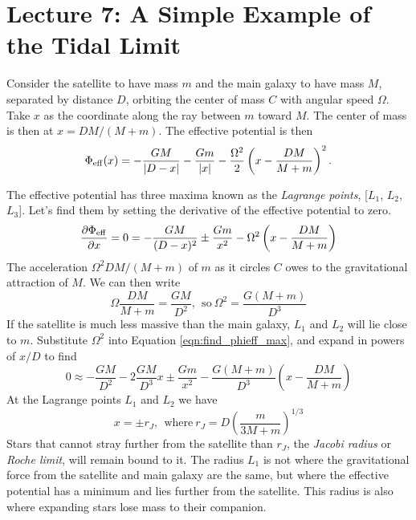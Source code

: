 \documentclass[]{article}
\begin{document}
\section{Lecture 7: A Simple Example of the Tidal Limit}

Consider the satellite to have mass $m$ and the main galaxy to have mass $M$, separated by distance $D$,
orbiting the center of mass $C$ with angular speed $\Omega$.  Take $x$ as the coordinate
along the ray between $m$ toward $M$.  The center of mass is then at $x=DM/(M+m)$.  The
effective potential is then
\begin{equation}
\Phi_\mathrm{eff}(x) = -\frac{GM}{|D-x|} -\frac{Gm}{|x|} - \frac{\Omega^2}{2}\left(x-\frac{DM}{M+m}\right)^2.
\end{equation}

The effective potential has three maxima known as the {\it Lagrange points}, [$L_1$, $L_2$, $L_3$].  Let's find them by setting
the derivative of the effective potential to zero.
\begin{equation}
\label{eqn:find_phieff_max}
\frac{\partial\Phi_\mathrm{eff}}{\partial x} = 0 = -\frac{GM}{(D-x)^2} \pm \frac{Gm}{x^2} - \Omega^2\left(x-\frac{DM}{M+m}\right)
\end{equation}
\noindent
The acceleration $\Omega^2DM/(M+m)$ of $m$ as it circles $C$ owes to the gravitational
attraction of $M$. We can then write
\begin{equation}
\Omega\frac{DM}{M+m}=\frac{GM}{D^2},~~\mathrm{so}~\Omega^2=\frac{G(M+m)}{D^3}
\end{equation}
\noindent
If the satellite is much less massive than the main galaxy, $L_1$ and $L_2$ will lie close to $m$.
Substitute $\Omega^2$ into Equation \ref{eqn:find_phieff_max}, and expand in powers of $x/D$ to find
\begin{equation}
0 \approx -\frac{GM}{D^2} - 2\frac{GM}{D^3}x \pm \frac{Gm}{x^2} - \frac{G(M+m)}{D^3}\left(x-\frac{DM}{M+m}\right)
\end{equation}
\noindent
At the Lagrange points $L_1$ and $L_2$ we have
\begin{equation}
x = \pm r_J, ~~\mathrm{where}~r_J = D\left(\frac{m}{3M+m}\right)^{1/3}
\end{equation}
\noindent
Stars that cannot stray further from the satellite than $r_J$, the {\it Jacobi radius} or {\it Roche limit},
will remain bound to it.  The radius $L_1$ is not where the gravitational force from the satellite and 
main galaxy are the same, but where the effective potential has a minimum and lies further from the satellite.
This radius is also where expanding stars lose mass to their companion.
\end{document}
